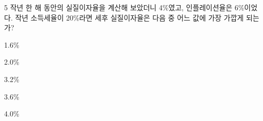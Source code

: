 \begin{question}{5}
작년 한 해 동안의 실질이자율을 계산해 보았더니 4\%였고, 인플레이션율은 6\%이었다. 작년 소득세율이 20\%라면 세후 실질이자율은 다음 중 어느 값에 가장 가깝게 되는가?
\begin{choices}
  \item 1.6\%
  \item 2.0\%
  \item 3.2\%
  \item 3.6\%
  \item 4.0\%
\end{choices}
\end{question}

